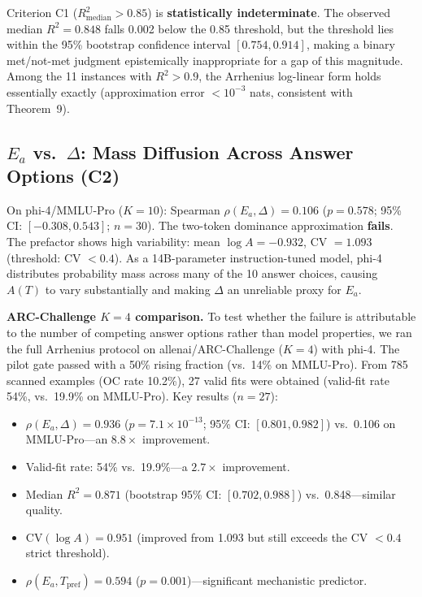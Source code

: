 \documentclass[11pt,letterpaper,twocolumn]{article}
\begin{document}
Criterion C1 ($R^2_\text{median} > 0.85$) is \textbf{statistically indeterminate}. The
observed median $R^2 = 0.848$ falls 0.002 below the 0.85 threshold, but the threshold
lies within the 95\% bootstrap confidence interval $[0.754, 0.914]$, making a binary
met/not-met judgment epistemically inappropriate for a gap of this magnitude. Among the
11 instances with $R^2 > 0.9$, the Arrhenius log-linear form holds essentially exactly
(approximation error $< 10^{-3}$ nats, consistent with Theorem~9).

\subsection{\texorpdfstring{$E_a$ vs.\ $\Delta$: Mass Diffusion Across Answer Options (C2)}{Ea vs. Delta: Mass Diffusion Across Answer Options (C2)}}

On phi-4/MMLU-Pro ($K=10$): Spearman $\rho(E_a, \Delta) = 0.106$ ($p = 0.578$; 95\% CI:
$[-0.308, 0.543]$; $n=30$). The two-token dominance approximation \textbf{fails}. The
prefactor shows high variability: mean $\log A = -0.932$, CV $= 1.093$ (threshold: CV
$< 0.4$). As a 14B-parameter instruction-tuned model, phi-4 distributes probability mass
across many of the 10 answer choices, causing $A(T)$ to vary substantially and making
$\Delta$ an unreliable proxy for $E_a$.

\textbf{ARC-Challenge $K=4$ comparison.} To test whether the failure is attributable to
the number of competing answer options rather than model properties, we ran the full
Arrhenius protocol on allenai/ARC-Challenge ($K=4$) with phi-4. The pilot gate passed
with a 50\% rising fraction (vs.\ 14\% on MMLU-Pro). From 785 scanned examples (OC rate
10.2\%), 27 valid fits were obtained (valid-fit rate 54\%, vs.\ 19.9\% on MMLU-Pro). Key
results ($n=27$):
\begin{itemize}[leftmargin=*,topsep=2pt,itemsep=2pt]
  \item $\rho(E_a, \Delta) = \mathbf{0.936}$ ($p = 7.1 \times 10^{-13}$; 95\% CI:
  $[0.801, 0.982]$) vs.\ 0.106 on MMLU-Pro---an $8.8\times$ improvement.
  \item Valid-fit rate: 54\% vs.\ 19.9\%---a $2.7\times$ improvement.
  \item Median $R^2 = 0.871$ (bootstrap 95\% CI: $[0.702, 0.988]$) vs.\ 0.848---similar quality.
  \item $\text{CV}(\log A) = 0.951$ (improved from 1.093 but still exceeds the CV $< 0.4$
  strict threshold).
  \item $\rho(E_a, T_\text{pref}) = 0.594$ ($p = 0.001$)---significant mechanistic predictor.
\end{itemize}
\end{document}
